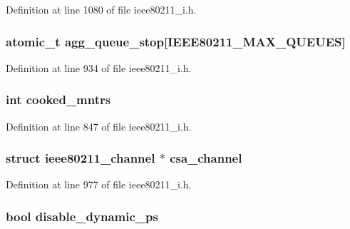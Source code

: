 Definition at line 1080 of file ieee80211\-\_\-i.\-h.

\hypertarget{structieee80211__local_a761ac48dbd4f02cca627bf2164691129}{
\subsubsection[{agg\-\_\-queue\-\_\-stop}]{\setlength{\rightskip}{0pt plus 5cm}atomic\-\_\-t agg\-\_\-queue\-\_\-stop\mbox{[}I\-E\-E\-E80211\-\_\-\-M\-A\-X\-\_\-\-Q\-U\-E\-U\-E\-S\mbox{]}}}\label{structieee80211__local_a761ac48dbd4f02cca627bf2164691129}


Definition at line 934 of file ieee80211\-\_\-i.\-h.

\hypertarget{structieee80211__local_a9ed7f1c7df7ff97118031d501ebf660c}{
\subsubsection[{cooked\-\_\-mntrs}]{\setlength{\rightskip}{0pt plus 5cm}int cooked\-\_\-mntrs}}\label{structieee80211__local_a9ed7f1c7df7ff97118031d501ebf660c}


Definition at line 847 of file ieee80211\-\_\-i.\-h.

\hypertarget{structieee80211__local_a02e1fa5047853fd7b4a5a35afa92afc0}{
\subsubsection[{csa\-\_\-channel}]{\setlength{\rightskip}{0pt plus 5cm}struct ieee80211\-\_\-channel $\ast$ csa\-\_\-channel}}\label{structieee80211__local_a02e1fa5047853fd7b4a5a35afa92afc0}


Definition at line 977 of file ieee80211\-\_\-i.\-h.

\hypertarget{structieee80211__local_a6b8c48108e6a22fba50ecf304fa6a4fc}{
\subsubsection[{disable\-\_\-dynamic\-\_\-ps}]{\setlength{\rightskip}{0pt plus 5cm}bool disable\-\_\-dynamic\-\_\-ps}}\label{structieee80211__local_a6b8c48108e6a22fba50ecf304fa6a4fc}


